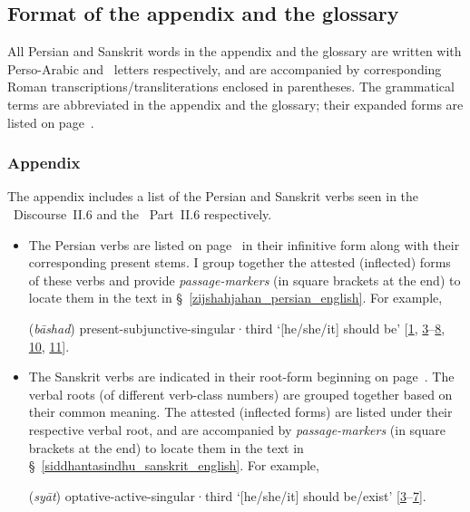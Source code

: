 \subsection{Format of the appendix and the glossary} \label{glossary_appendix_format} 
All Persian and Sanskrit words in the appendix and the glossary are written with Perso-Arabic and \Nagari\ letters respectively, and are accompanied by corresponding Roman transcriptions/transliterations enclosed in parentheses. The grammatical terms are abbreviated in the appendix and the glossary; their expanded forms are listed on page~\pageref{acronym}. 

\subsubsection*{Appendix}\label{format_appendix}
The appendix includes a list of the Persian and Sanskrit verbs seen in the \ZijiShahJahani\ Discourse~II.6 and the \Siddhantasindhu\ Part~II.6 respectively. 
\begin{itemize}[topsep=0pt]
\item The Persian verbs are listed on page~\pageref{persian_verbs} in their infinitive form along with their corresponding present stems. I group together the attested (inflected) forms of these verbs and provide \textit{passage-markers} (in square brackets at the end) to locate them in the text in \S~\ref{zijshahjahan_persian_english}. For example,
{\par\centering{} (\textit{bāshad})  \acrshort{present}-\acrshort{subjunctive}-\acrshort{singular}·\acrshort{third} `[he/she/it] should be' [\hyperlink{Ppass1}{1}, \hyperlink{Ppass3}{3}--\hyperlink{Ppass8}{8}, \hyperlink{Ppass10}{10}, \hyperlink{Ppass11}{11}].\par}
\item The Sanskrit verbs are indicated in their root-form beginning on page~\pageref{sanskrit_verbs}. The verbal roots (of different verb-class numbers) are grouped together based on their common meaning. The attested (inflected forms) are listed under their respective verbal root, and are accompanied by \textit{passage-markers} (in square brackets at the end) to locate them in the text in \S~\ref{siddhantasindhu_sanskrit_english}. For example,
{\par\centering
{} (\textit{syāt}) \acrshort{optative}-\acrshort{active}-\acrshort{singular}·\acrshort{third} `[he/she/it] should be/exist' [\hyperlink{Spass3}{3}--\hyperlink{Spass7}{7}].
\par}
\end{itemize}

